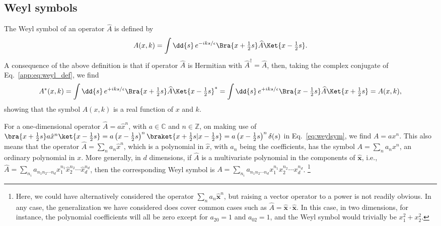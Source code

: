 \subsection{Weyl symbols}

The Weyl symbol of an operator $\widehat{A}$ is defined by
%
\begin{equation}
  A(x, k) = \int \dd{s}\, e^{-iks/\epsilon} \Bra{x + \tfrac{1}{2}s}\widehat{A}\Ket{x - \tfrac{1}{2}s}.
  \label{app:eq:weyl_def}
\end{equation}
%
A consequence of the above definition is that if operator $\widehat{A}$ is Hermitian with $\widehat{A}^{\dagger} = \widehat{A}$, then, taking the complex conjugate of Eq.~\eqref{app:eq:weyl_def}, we find
%
\begin{equation}
  A^{*}(x, k) = \int \dd{s}\, e^{+iks/\epsilon} \Bra{x + \tfrac{1}{2}s}\widehat{A}\Ket{x - \tfrac{1}{2}s}^{*}
  = \int \dd{s}\, e^{+iks/\epsilon} \Bra{x - \tfrac{1}{2}s}\widehat{A}\Ket{x + \tfrac{1}{2}s} = A(x, k),
  \label{eq:weylsym}
\end{equation}
%
showing that the symbol $A(x, k)$ is a real function of $x$ and $k$.

\begin{example}
  For a one-dimensional operator $\widehat{A} = a\hat{x}^{n}$, with $a \in \mathbb{C}$ and $n \in \mathbb{Z}$, on making use of $\bra{x + \tfrac{1}{2}s}a\hat{x}^{n}\ket{x - \tfrac{1}{2}s} = a \left(x - \tfrac{1}{2}s\right)^{n}\braket{x + \tfrac{1}{2}s | x - \tfrac{1}{2}s} = a\left(x - \tfrac{1}{2}s\right)^{n} \delta(s)$ in Eq.~\eqref{eq:weylsym}, we find $A = a x^{n}$.
  This also means that the operator $\widehat{A} = \sum_{n} a_{n}\hat{x}^{n}$, which is a polynomial in $\hat{x}$, with $a_{n}$ being the coefficients, has the symbol
  $A = \sum_{n} a_{n}{x}^{n}$, an ordinary polynomial in $x$.
  More generally, in $d$ dimensions, if $\widehat{A}$ is a multivariate polynomial in the components of $\hat{\bm{x}}$, i.e., $\widehat{A} = \sum_{n_{i}} a_{n_{1}n_{2}\cdots n_{d}} \hat{x}_{1}^{n_{1}}\hat{x}_{2}^{n_{2}}\cdots \hat{x}_{d}^{n_{d}}$, then the corresponding Weyl symbol is $A = \sum_{n_{i}} a_{n_{1}n_{2}\cdots n_{d}} {x}_{1}^{n_{1}}{x}_{2}^{n_{2}}\cdots {x}_{d}^{n_{d}}$.%
  \footnote{Here, we could have alternatively considered the operator $\sum_{n} a_{n} \hat{\bm{x}}^{n}$, but raising a vector operator to a power is not readily obvious.
    In any case, the generalization we have considered does cover common cases such as $\widehat{A} = \hat{\bm{x}}\cdot\hat{\bm{x}}$.
  In this case, in two dimensions, for instance, the polynomial coefficients will all be zero except for $a_{20} = 1$ and $a_{02} = 1$, and the Weyl symbol would trivially be $x_{1}^{2} + x_{2}^{2}$.}
\end{example}

